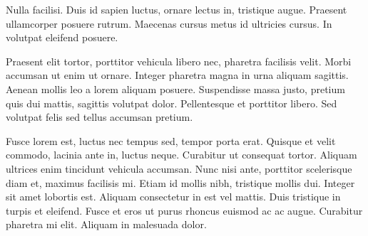 \documentclass[12pt]{journalrebuttal}
\begin{document}
\nextreviewer
\begin{revcomment}
Nulla facilisi. Duis id sapien luctus, ornare lectus in, tristique augue. Praesent ullamcorper posuere rutrum. Maecenas cursus metus id ultricies cursus. In volutpat eleifend posuere. 
\end{revcomment}
\begin{response}
Praesent elit tortor, porttitor vehicula libero nec, pharetra facilisis velit. Morbi accumsan ut enim ut ornare. Integer pharetra magna in urna aliquam sagittis. Aenean mollis leo a lorem aliquam posuere. Suspendisse massa justo, pretium quis dui mattis, sagittis volutpat dolor. Pellentesque et porttitor libero. Sed volutpat felis sed tellus accumsan pretium.

Fusce lorem est, luctus nec tempus sed, tempor porta erat. Quisque et velit commodo, lacinia ante in, luctus neque. Curabitur ut consequat tortor. Aliquam ultrices enim tincidunt vehicula accumsan. Nunc nisi ante, porttitor scelerisque diam et, maximus facilisis mi. Etiam id mollis nibh, tristique mollis dui. Integer sit amet lobortis est. Aliquam consectetur in est vel mattis. Duis tristique in turpis et eleifend. Fusce et eros ut purus rhoncus euismod ac ac augue. Curabitur pharetra mi elit. Aliquam in malesuada dolor.
\end{response}
\end{document}
